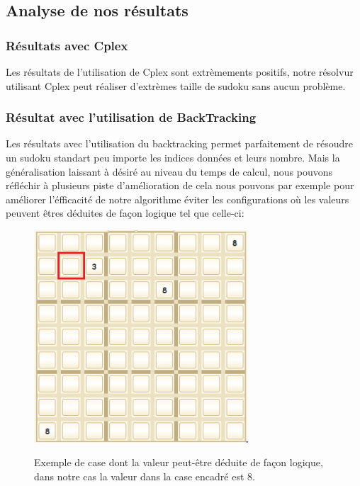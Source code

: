 \subsection{Analyse de nos résultats}

\subsubsection{Résultats avec Cplex}

Les résultats de l'utilisation de Cplex sont extrèmements positifs, notre résolvur utilisant Cplex peut réaliser d'extrèmes taille de sudoku sans aucun problème.

\subsubsection{Résultat avec l'utilisation de BackTracking}

Les résultats avec l'utilisation du backtracking permet parfaitement de résoudre un sudoku standart peu importe les indices données et leurs nombre. Mais la généralisation laissant à désiré au niveau du temps de calcul, nous pouvons réfléchir à plusieurs piste d'amélioration de cela nous pouvons par exemple pour améliorer l'éfficacité de notre algorithme éviter les configurations où les valeurs peuvent êtres déduites de façon logique tel que celle-ci:

\begin{figure}[h]
  \begin{center}
\includegraphics[width=8cm]{./images/Exemple_deduction.png}\label{Exemple_Logique}
\caption{Exemple de case dont la valeur peut-être déduite de façon logique, dans notre cas la valeur dans la case encadré est 8.}
\end{center}
\end{figure}
